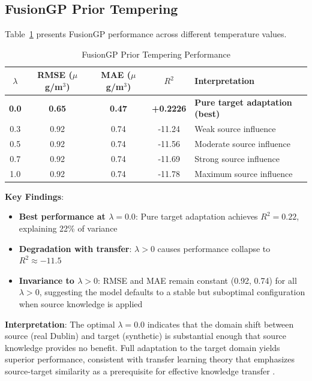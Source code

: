 \subsection{FusionGP Prior Tempering}
\label{subsec:fusiongp_pt}

Table~\ref{tab:fusiongp_pt} presents FusionGP performance across different temperature values.

\begin{table}[htbp]
\centering
\caption{FusionGP Prior Tempering Performance}
\label{tab:fusiongp_pt}
\begin{tabular}{ccccp{4.5cm}}
\toprule
\(\lambda\) & RMSE (\(\mu\)g/m\(^3\)) & MAE (\(\mu\)g/m\(^3\)) & \(R^2\) & Interpretation \\
\midrule
\textbf{0.0} & \textbf{0.65} & \textbf{0.47} & \textbf{+0.2226} & \textbf{Pure target adaptation (best)} \\
0.3 & 0.92 & 0.74 & -11.24 & Weak source influence \\
0.5 & 0.92 & 0.74 & -11.56 & Moderate source influence \\
0.7 & 0.92 & 0.74 & -11.69 & Strong source influence \\
1.0 & 0.92 & 0.74 & -11.78 & Maximum source influence \\
\bottomrule
\end{tabular}
\end{table}

\textbf{Key Findings}:
\begin{itemize}
    \item \textbf{Best performance at \(\lambda=0.0\)}: Pure target adaptation achieves \(R^2=0.22\), explaining 22\% of variance
    \item \textbf{Degradation with transfer}: \(\lambda>0\) causes performance collapse to \(R^2 \approx -11.5\)
    \item \textbf{Invariance to \(\lambda>0\)}: RMSE and MAE remain constant (0.92, 0.74) for all \(\lambda>0\), suggesting the model defaults to a stable but suboptimal configuration when source knowledge is applied
\end{itemize}

\textbf{Interpretation}: The optimal \(\lambda=0.0\) indicates that the domain shift between source (real Dublin) and target (synthetic) is substantial enough that source knowledge provides no benefit. Full adaptation to the target domain yields superior performance, consistent with transfer learning theory that emphasizes source-target similarity as a prerequisite for effective knowledge transfer \citet{pan2010survey}.

